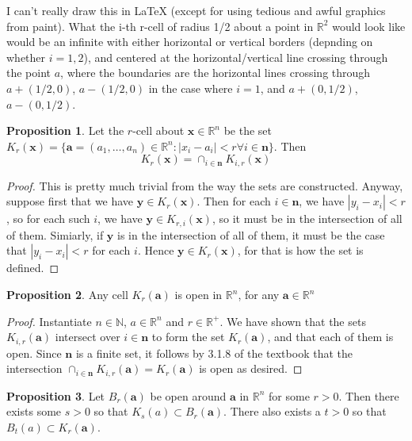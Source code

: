 \documentclass[11pt]{article}
\newcommand{\R}{\mathbb{R}}
\newcommand{\N}{\mathbb{N}}
\theoremstyle{definition}
\newtheorem{proposition}{Proposition}
\begin{document}
I can't really draw this in LaTeX (except for using tedious and awful graphics from paint). What the i-th r-cell of radius 1/2 about a point in $\R^2$ would look like would be an infinite with either horizontal or vertical borders (depnding on whether $i = 1,2$), and centered at the horizontal/vertical line crossing through the point $a$, where the boundaries are the horizontal lines crossing through $a + (1/2,0)$, $a-(1/2,0)$ in the case where $i = 1$, and $a + (0,1/2)$, $a-(0,1/2)$. 



\begin{proposition}
Let the $r$-cell about $\mathbf{x}\in \R^n$ be the set 
$K_r(\mathbf{x}) = \{\mathbf{a} = (a_1,\dots, a_n) \in \R^n : |x_i - a_i|< r \forall i\in \mathbf{n}\}$. Then 
\[
K_r(\mathbf{x}) = \cap_{i\in \mathbf{n}}K_{i,r}(\mathbf{x})
\]
\end{proposition}

\begin{proof}
This is pretty much trivial from the way the sets are constructed. Anyway, suppose first that we have $\mathbf{y}\in K_r(\mathbf{x})$. Then for each $i\in \mathbf{n}$, we have $|y_i - x_i| < r$, so for each such $i$, we have $ \mathbf{y} \in K_{r,i}(\mathbf{x})$, so it must be in the intersection of all of them. Simiarly, if $\mathbf{y}$ is in the intersection of all of them, it must be the case that $|y_i - x_i| < r$ for each $i$. Hence $\mathbf{y}\in K_r(\mathbf{x})$, for that is how the set is defined.

 \end{proof}

\begin{proposition}
Any cell $K_r(\mathbf{a})$ is open in $\R^n$, for any $\mathbf{a}\in \R^n$
\end{proposition}
\begin{proof}
Instantiate $n\in \N$, $a\in \R^n$ and $r\in \R^+$. We have shown that the sets $K_{i,r}(\mathbf{a}) $ intersect over $i\in \mathbf{n}$ to form the set $K_r(\mathbf{a})$, and that each of them is open. Since $\mathbf{n}$ is a finite set, it follows by 3.1.8 of the textbook that the intersection $\cap_{i\in \mathbf{n}}K_{i,r}(\mathbf{a}) = K_r(\mathbf{a})$ is open as desired.
\end{proof}


\begin{proposition} Let $B_r(\mathbf{a})$ be open around $\mathbf{a}$ in $\R^n$ for some $r>0$. Then there exists some $s>0$ so that $K_s(a)\subset B_r(\mathbf{a})$. There also exists a $t>0$ so that $B_t(a) \subset K_r(\mathbf{a})$.
\end{proposition}
\end{document}
